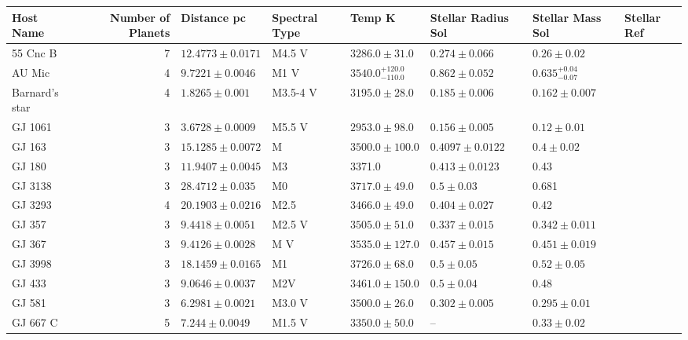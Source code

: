 \begin{tabular}{lrllllll}
\toprule
Host Name & Number of Planets & Distance pc & Spectral Type & Temp K & Stellar Radius Sol & Stellar Mass Sol & Stellar Ref \\
\midrule
55 Cnc B & 7 & $12.4773 \pm 0.0171$ & M4.5 V & $3286.0 \pm 31.0$ & $0.274 \pm 0.066$ & $0.26 \pm 0.02$ & \cite{MOUTOU_ET_AL_2026} \\
AU Mic & 4 & $9.7221 \pm 0.0046$ & M1 V & $3540.0^{+120.0}_{-110.0}$ & $0.862 \pm 0.052$ & $0.635^{+0.04}_{-0.07}$ & \cite{MALLORQUIN_ET_AL_2024} \\
Barnard's star & 4 & $1.8265 \pm 0.001$ & M3.5-4 V & $3195.0 \pm 28.0$ & $0.185 \pm 0.006$ & $0.162 \pm 0.007$ & \cite{GONZALEZ_HERNANDEZ_ET_AL_2024} \\
GJ 1061 & 3 & $3.6728 \pm 0.0009$ & M5.5 V & $2953.0 \pm 98.0$ & $0.156 \pm 0.005$ & $0.12 \pm 0.01$ & \cite{DREIZLER_ET_AL_2025} \\
GJ 163 & 3 & $15.1285 \pm 0.0072$ & M & $3500.0 \pm 100.0$ & $0.4097 \pm 0.0122$ & $0.4 \pm 0.02$ & \cite{TUOMI_ET_AL__2013} \\
GJ 180 & 3 & $11.9407 \pm 0.0045$ & M3 & 3371.0 & $0.413 \pm 0.0123$ & 0.43 & \cite{TUOMI_ET_AL__2014} \\
GJ 3138 & 3 & $28.4712 \pm 0.035$ & M0 & $3717.0 \pm 49.0$ & $0.5 \pm 0.03$ & 0.681 & \cite{ASTUDILLO_DEFRU_ET_AL__2017} \\
GJ 3293 & 4 & $20.1903 \pm 0.0216$ & M2.5 & $3466.0 \pm 49.0$ & $0.404 \pm 0.027$ & 0.42 & \cite{ASTUDILLO_DEFRU_ET_AL__2017} \\
GJ 357 & 3 & $9.4418 \pm 0.0051$ & M2.5 V & $3505.0 \pm 51.0$ & $0.337 \pm 0.015$ & $0.342 \pm 0.011$ & \cite{ODDO_ET_AL__2023} \\
GJ 367 & 3 & $9.4126 \pm 0.0028$ & M V & $3535.0 \pm 127.0$ & $0.457 \pm 0.015$ & $0.451 \pm 0.019$ & \cite{LEE_ET_AL_2026} \\
GJ 3998 & 3 & $18.1459 \pm 0.0165$ & M1 & $3726.0 \pm 68.0$ & $0.5 \pm 0.05$ & $0.52 \pm 0.05$ & \cite{STEFANOV_ET_AL__2025} \\
GJ 433 & 3 & $9.0646 \pm 0.0037$ & M2V & $3461.0 \pm 150.0$ & $0.5 \pm 0.04$ & 0.48 & \cite{STASSUN_ET_AL__2017} \\
GJ 581 & 3 & $6.2981 \pm 0.0021$ & M3.0 V & $3500.0 \pm 26.0$ & $0.302 \pm 0.005$ & $0.295 \pm 0.01$ & \cite{VON_STAUFFENBERG_ET_AL__2024} \\
GJ 667 C & 5 & $7.244 \pm 0.0049$ & M1.5 V & $3350.0 \pm 50.0$ & -- & $0.33 \pm 0.02$ & \cite{ANGLADA_ESCUDE_ET_AL__2013} \\

\end{tabular}
